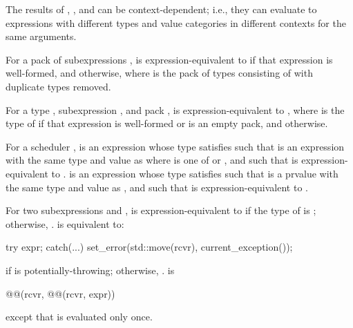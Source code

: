 \pnum
The results of , , and 
can be context-dependent;
i.e., they can evaluate to expressions
with different types and value categories
in different contexts for the same arguments.

\pnum
For a pack of subexpressions ,
 is expression-equivalent to
if that expression is well-formed, and
 otherwise,
where  is the pack of types consisting of
 with duplicate types removed.

\pnum
For a type , subexpression , and pack ,
is expression-equivalent to ,
where  is
the type of 
if that expression is well-formed or  is an empty pack, and
 otherwise.

\pnum
For a scheduler ,
 is an expression 
whose type satisfies 
such that  is
an expression with the same type and value as 
where  is one of  or , and
such that  is expression-equivalent to
.
 is an expression 
whose type satisfies 
such that  is a prvalue
with the same type and value as , and
such that  is expression-equivalent to
.

\pnum
For two subexpressions  and ,
 is expression-equivalent to
if the type of  is ;
otherwise, .
 is equivalent to:
\begin{codeblock}
try {
  expr;
} catch(...) {
  set_error(std::move(rcvr), current_exception());
}
\end{codeblock}
if  is potentially-throwing; otherwise, .
 is
\begin{codeblock}
@@(rcvr, @@(rcvr, expr))
\end{codeblock}
except that  is evaluated only once.

